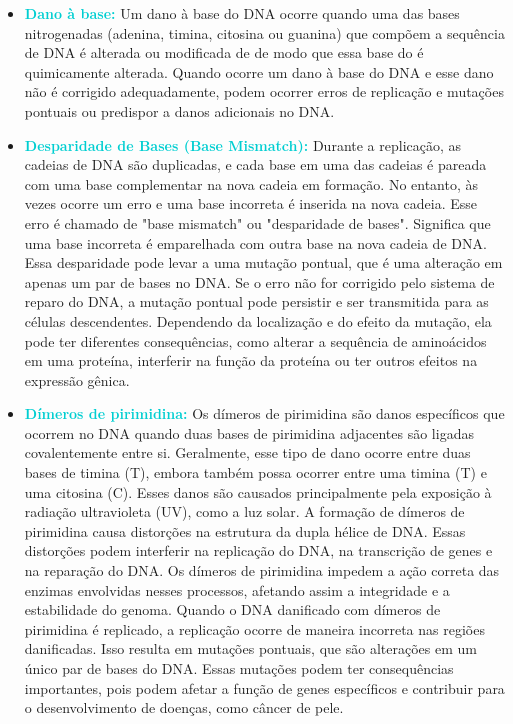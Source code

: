 \documentclass[11pt,a4paper]{article}
\begin{document}
	\begin{itemize}[label=\textcolor{CarnationPink}{$\blacktriangleright$}]
		\item \textcolor{DarkTurquoise}{\textbf{Dano à base: }} Um dano à base do DNA ocorre quando uma das bases nitrogenadas (adenina, timina, citosina ou guanina) que compõem a sequência de DNA é alterada ou modificada de de modo que essa base do é quimicamente alterada. Quando ocorre um dano à base do DNA e esse dano não é corrigido adequadamente, podem ocorrer erros de replicação e mutações pontuais ou predispor a danos adicionais no DNA.
		
		\item \textcolor{DarkTurquoise}{\textbf{Desparidade de Bases (Base Mismatch):}} Durante a replicação, as cadeias de DNA são duplicadas, e cada base em uma das cadeias é pareada com uma base complementar na nova cadeia em formação. No entanto, às vezes ocorre um erro e uma base incorreta é inserida na nova cadeia. Esse erro é chamado de "base mismatch" ou "desparidade de bases". Significa que uma base incorreta é emparelhada com outra base na nova cadeia de DNA. Essa desparidade pode levar a uma mutação pontual, que é uma alteração em apenas um par de bases no DNA. Se o erro não for corrigido pelo sistema de reparo do DNA, a mutação pontual pode persistir e ser transmitida para as células descendentes. Dependendo da localização e do efeito da mutação, ela pode ter diferentes consequências, como alterar a sequência de aminoácidos em uma proteína, interferir na função da proteína ou ter outros efeitos na expressão gênica.
		
		\item \textcolor{DarkTurquoise}{\textbf{Dímeros de pirimidina:}} Os dímeros de pirimidina são danos específicos que ocorrem no DNA quando duas bases de pirimidina adjacentes são ligadas covalentemente entre si. Geralmente, esse tipo de dano ocorre entre duas bases de timina (T), embora também possa ocorrer entre uma timina (T) e uma citosina (C). Esses danos são causados principalmente pela exposição à radiação ultravioleta (UV), como a luz solar. A formação de dímeros de pirimidina causa distorções na estrutura da dupla hélice de DNA. Essas distorções podem interferir na replicação do DNA, na transcrição de genes e na reparação do DNA. Os dímeros de pirimidina impedem a ação correta das enzimas envolvidas nesses processos, afetando assim a integridade e a estabilidade do genoma. Quando o DNA danificado com dímeros de pirimidina é replicado, a replicação ocorre de maneira incorreta nas regiões danificadas. Isso resulta em mutações pontuais, que são alterações em um único par de bases do DNA. Essas mutações podem ter consequências importantes, pois podem afetar a função de genes específicos e contribuir para o desenvolvimento de doenças, como câncer de pele.
		

\end{itemize}
\end{document}
